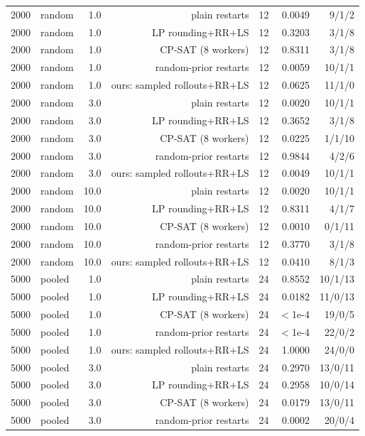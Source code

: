 \begin{table}[t]
\begin{tabular}{llrrrrr}
2000 & random & 1.0 & plain restarts & 12 & 0.0049 & 9/1/2 \\
2000 & random & 1.0 & LP rounding+RR+LS & 12 & 0.3203 & 3/1/8 \\
2000 & random & 1.0 & CP-SAT (8 workers) & 12 & 0.8311 & 3/1/8 \\
2000 & random & 1.0 & random-prior restarts & 12 & 0.0059 & 10/1/1 \\
2000 & random & 1.0 & ours: sampled rollouts+RR+LS & 12 & 0.0625 & 11/1/0 \\
2000 & random & 3.0 & plain restarts & 12 & 0.0020 & 10/1/1 \\
2000 & random & 3.0 & LP rounding+RR+LS & 12 & 0.3652 & 3/1/8 \\
2000 & random & 3.0 & CP-SAT (8 workers) & 12 & 0.0225 & 1/1/10 \\
2000 & random & 3.0 & random-prior restarts & 12 & 0.9844 & 4/2/6 \\
2000 & random & 3.0 & ours: sampled rollouts+RR+LS & 12 & 0.0049 & 10/1/1 \\
2000 & random & 10.0 & plain restarts & 12 & 0.0020 & 10/1/1 \\
2000 & random & 10.0 & LP rounding+RR+LS & 12 & 0.8311 & 4/1/7 \\
2000 & random & 10.0 & CP-SAT (8 workers) & 12 & 0.0010 & 0/1/11 \\
2000 & random & 10.0 & random-prior restarts & 12 & 0.3770 & 3/1/8 \\
2000 & random & 10.0 & ours: sampled rollouts+RR+LS & 12 & 0.0410 & 8/1/3 \\
5000 & pooled & 1.0 & plain restarts & 24 & 0.8552 & 10/1/13 \\
5000 & pooled & 1.0 & LP rounding+RR+LS & 24 & 0.0182 & 11/0/13 \\
5000 & pooled & 1.0 & CP-SAT (8 workers) & 24 & $<$1e-4 & 19/0/5 \\
5000 & pooled & 1.0 & random-prior restarts & 24 & $<$1e-4 & 22/0/2 \\
5000 & pooled & 1.0 & ours: sampled rollouts+RR+LS & 24 & 1.0000 & 24/0/0 \\
5000 & pooled & 3.0 & plain restarts & 24 & 0.2970 & 13/0/11 \\
5000 & pooled & 3.0 & LP rounding+RR+LS & 24 & 0.2958 & 10/0/14 \\
5000 & pooled & 3.0 & CP-SAT (8 workers) & 24 & 0.0179 & 13/0/11 \\
5000 & pooled & 3.0 & random-prior restarts & 24 & 0.0002 & 20/0/4 \\

\end{tabular}
\end{table}
